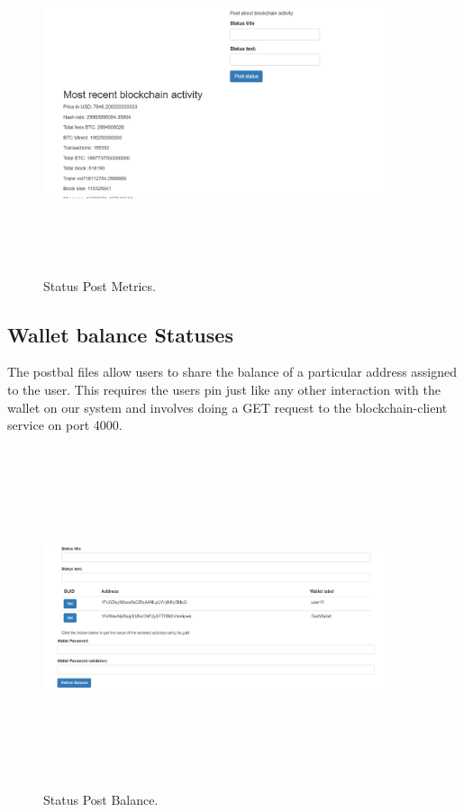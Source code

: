 \begin{figure}[H]
\centering
\includegraphics[width=10cm, height=10cm]{img/post3.png}
\caption{Status Post Metrics.}
\end{figure}

\subsection{Wallet balance Statuses}
 The postbal files allow users to share the balance of a particular address assigned to the user. This requires the users pin just like any other interaction with the wallet on our system and involves doing a GET request to the blockchain-client service on port 4000.
 
 \begin{figure}[H]
\centering
\includegraphics[width=10cm, height=10cm]{img/post2.png}
\caption{Status Post Balance.}
\end{figure}

